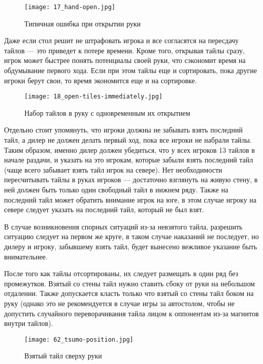 \begin{figure}[H]
	\centering
	\texttt{[image: 17\_hand-open.jpg]}
	\caption{Типичная ошибка при открытии руки}
\end{figure}

Даже если стол решит не штрафовать игрока и все согласятся на пересдачу тайлов --- это приведет к потере времени. Кроме того, открывая тайлы сразу, игрок может быстрее понять потенциалы своей руки, что сэкономит время на обдумывание первого хода. Если при этом тайлы еще и сортировать, пока другие игроки берут свои, то время экономится еще и на сортировке.

\begin{figure}[H]
	\centering
	\texttt{[image: 18\_open-tiles-immediately.jpg]}
	\caption{Набор тайлов в руку с одновременным их открытием}
\end{figure}

Отдельно стоит упомянуть, что игроки должны не забывать взять последний тайл, а дилер не должен делать первый ход, пока все игроки не набрали тайлы. Таким образом, именно дилер должен убедиться, что у всех игроков 13 тайлов в начале раздачи, и указать на это игрокам, которые забыли взять последний тайл (чаще всего забывает взять тайл игрок на севере). Нет необходимости пересчитывать тайлы в руках игроков --- достаточно взглянуть на живую стену, в ней должен быть только один свободный тайл в нижнем ряду. Также на последний тайл может обратить внимание игрок на юге, в этом случае игроку на севере следует указать на последний тайл, который не был взят. 

В случае возникновения спорных ситуаций из-за невзятого тайла, разрешить ситуацию следует на первом же круге, в таком случае наказаний не последует, но дилеру и игроку, забывшему взять тайл, будет вынесено вежливое указание быть внимательнее. 

После того как тайлы отсортированы, их следует размещать в один ряд без промежутков. Взятый со стены тайл нужно ставить сбоку от руки на небольшом отдалении. Также допускается класть только что взятый со стены тайл боком на руку (однако это не рекомендуется в случае игры за автостолом, чтобы не допустить случайного переворачивания тайла лицом к оппонентам из-за магнитов внутри тайлов).

\begin{figure}[H]
	\centering
	\texttt{[image: 62\_tsumo-position.jpg]}
	\caption{Взятый тайл сверху руки}
\end{figure}

